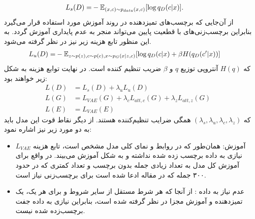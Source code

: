 \begin{equation}
	\begin{split}
		L_{s} (D) =& -\mathbb E_{(x,c) \sim p_{data}(x,c)} [\log q_D(c|x)].
	\end{split}
\end{equation}
از آن‌جایی که برچسب‌های تمیزدهنده در روند آموزش مورد استفاده قرار می‌گیرد بنابراین برچسب‌زنی‌های با قطعیت پایین می‌تواند منجر به عدم پایداری آموزش گردد. به این منظور تابع هزینه زیر نیز در نظر گرفته می‌شود.
\begin{equation}
	\begin{split}
		L_{u} (D) =& -\mathbb E_{z \sim p(z), c \sim p(c), x \sim p_G(x|z,c)} [\log q_D(c|x) + \beta H(q_D(c'|x))]
	\end{split}
\end{equation}
که $H(q)$ آنتروپی توزیع $q$ و $\beta$ ضریب تنظیم کننده است.
در نهایت توابع هزینه به شکل زیر خواهند بود:
\begin{equation}
	\begin{split}
		L (D) &= L_{s} (D) + \lambda_u L_{u} (D)\\
		L (G) &= L_{VAE} (G) + \lambda_c L_{att, c} (G) + \lambda_z L_{att, z} (G)\\
		L (E) &= L_{VAE} (E)
	\end{split}
\end{equation}
که $(\lambda_s, \lambda_u, \lambda_c , \lambda_z)$ همگی ضرایب تنظیم‌کننده هستند. از دیگر نقاط قوت این مدل باید به دو مورد زیر نیز اشاره نمود:
\renewcommand{\labelitemi}{$\bullet$}
\begin{itemize}
	\item

	      آموزش:
	      همان‌طور که در روابط و نمای کلی مدل مشخص است، تابع هزینه $L_{VAE}$ نیازی به داده برچسب زده شده نداشته و به شکل   آموزش می‌بیند. در واقع برای آموزش کل مدل به تعداد زیادی جمله بدون برچسب و تعداد کمتری که در حدود ۳۰۰ جمله که در مقاله ادعا شده است برای برچسب‌زنی نیاز است.
	\item
	      عدم نیاز به داده :
	      از آنجا که هر شرط مستقل از سایر شروط و برای هر یک، یک تمیزدهنده و آموزش مجزا در نظر گرفته شده است، بنابراین نیازی به داده جفت برچسب‌زده شده نیست.
\end{itemize}